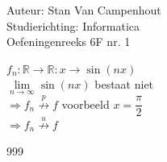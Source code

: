 \documentclass[a4paper]{article}
\begin{document}
  
\noindent \large Auteur: Stan Van Campenhout \\
\noindent \large Studierichting:  Informatica\\
\noindent \large Oefeningenreeks 6F nr. 1\\

\medskip

\normalsize

$ f_n : \mathbb{R} \rightarrow \mathbb{R}  : x \rightarrow \sin(nx) $\\

$ \lim\limits_{n \rightarrow \infty} \sin(nx) $ bestaat niet \\

$ \Rightarrow f_n \stackrel{p}{\not\rightarrow} f $ voorbeeld $ x = \dfrac{\pi}{2} $\\

$ \Rightarrow f_n \stackrel{u}{\not\rightarrow} f $\\

\begin{thebibliography}{999}
\end{thebibliography}
\end{document}
